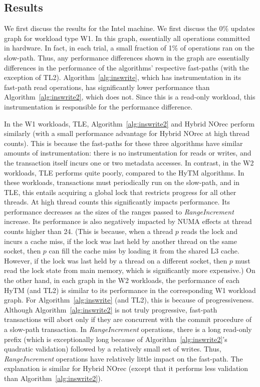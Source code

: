 \subsection{Results}
We first discuss the results for the Intel machine.
We first discuss the 0\% updates graph for workload type W1.
In this graph, essentially all operations committed in hardware.
In fact, in each trial, a small fraction of 1\% of operations ran on the slow-path.
Thus, any performance differences shown in the graph are essentially differences in the performance of the algorithms' respective fast-paths (with the exception of TL2).
Algorithm~\ref{alg:inswrite}, which has instrumentation in its fast-path read operations, has significantly lower performance than Algorithm~\ref{alg:inswrite2}, which does not.
Since this is a read-only workload, this instrumentation is responsible for the performance difference.

In the W1 workloads, TLE, Algorithm~\ref{alg:inswrite2} and Hybrid NOrec perform similarly (with a small performance advantage for Hybrid NOrec at high thread counts).
This is because the fast-paths for these three algorithms have similar amounts of instrumentation: there is no instrumentation for reads or writes, 
and the transaction itself incurs one or two metadata accesses.
In contrast, in the W2 workloads, TLE performs quite poorly, compared to the HyTM algorithms.
In these workloads, transactions must periodically run on the slow-path, and in TLE, 
this entails acquiring a global lock that restricts progress for all other threads.
At high thread counts this significantly impacts performance.
Its performance decreases as the sizes of the ranges passed to \textit{RangeIncrement} increase.
Its performance is also negatively impacted by NUMA effects at thread counts higher than 24.
(This is because, when a thread $p$ reads the lock and incurs a cache miss, 
if the lock was last held by another thread on the same socket, 
then $p$ can fill the cache miss by loading it from the shared L3 cache.
However, if the lock was last held by a thread on a different socket, 
then $p$ must read the lock state from main memory, which is significantly more expensive.)
On the other hand, in each graph in the W2 workloads, the performance of each HyTM (and TL2) is similar to its performance in the corresponding W1 workload graph.
For Algorithm~\ref{alg:inswrite} (and TL2), this is because of progressiveness.
Although Algorithm~\ref{alg:inswrite2} is not truly progressive, fast-path transactions will abort only if they are concurrent with the commit procedure of a slow-path transaction.
In \textit{RangeIncrement} operations, there is a long read-only prefix (which is exceptionally long because of Algorithm~\ref{alg:inswrite2}'s quadratic validation) followed by a relatively small set of writes.
Thus, \textit{RangeIncrement} operations have relatively little impact on the fast-path.
The explanation is similar for Hybrid NOrec (except that it performs less validation than Algorithm~\ref{alg:inswrite2}).

